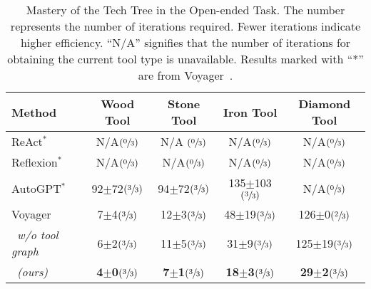 
\begin{table*}[t]
\caption{Mastery of the Tech Tree in the Open-ended Task. The number represents the number of iterations required. Fewer iterations indicate higher efficiency. “N/A” signifies that the number of iterations for obtaining the current tool type is unavailable. Results marked with “*” are from Voyager~\citep{wang2023voyager}.}
\label{tab:Open-Ended Task}
\vskip -0.1in  %
\setlength{\tabcolsep}{12pt} %
\renewcommand{\arraystretch}{1} %
\begin{center}
\begin{small}
\begin{sc}
\begin{tabular}{lcccc} %
\toprule
\textnormal{\textbf{Method}} & \textnormal{\textbf{Wood Tool}} & \textnormal{\textbf{Stone Tool}} & \textnormal{\textbf{Iron Tool}} & \textnormal{\textbf{Diamond Tool}} \\
\midrule

\normalfont ReAct$^{*}$ & N/A$(\sfrac{0}{3})$ & N/A $(\sfrac{0}{3})$ & N/A$(\sfrac{0}{3})$ & N/A$(\sfrac{0}{3})$ \\
\normalfont Reflexion$^{*}$ & N/A$(\sfrac{0}{3})$ & N/A$(\sfrac{0}{3})$ & N/A$(\sfrac{0}{3})$ & N/A$(\sfrac{0}{3})$ \\
\normalfont AutoGPT$^{*}$  & 92$\pm$72$(\sfrac{3}{3})$ & 94$\pm$72$(\sfrac{3}{3})$ & 135$\pm$103$(\sfrac{3}{3})$ & N/A$(\sfrac{0}{3})$ \\
\normalfont Voyager & 7$\pm$4$(\sfrac{3}{3})$ & 12$\pm$3$(\sfrac{3}{3})$ & 48$\pm$19$(\sfrac{3}{3})$ & 126$\pm$0$(\sfrac{2}{3})$ \\
\normalfont {\ours}~\textit{\small w/o tool graph}  & 6$\pm$2$(\sfrac{3}{3})$ & 11$\pm$5$(\sfrac{3}{3})$ & 31$\pm$9$(\sfrac{3}{3})$ & 125$\pm$19$(\sfrac{3}{3})$ \\
\normalfont {\ours}~\textit{\small(ours)} & \textbf{4$\pm$0}$(\sfrac{3}{3})$ & \textbf{7$\pm$1}$(\sfrac{3}{3})$ & \textbf{18$\pm$3}$(\sfrac{3}{3})$ & \textbf{29$\pm$2}$(\sfrac{3}{3})$ \\

\bottomrule
\end{tabular}
\end{sc}
\end{small}
\end{center}
\vskip -0.15in
\end{table*}









